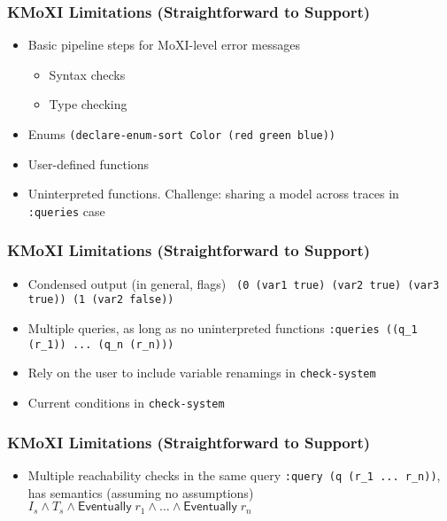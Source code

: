 \documentclass[11pt,xcolor={dvipsnames},hyperref={pdftex,pdfpagemode=UseNone,hidelinks,pdfdisplaydoctitle=true},usepdftitle=false]{beamer}
\newcommand{\code}[1]{{\footnotesize\texttt{#1}}}
\begin{document}
\begin{frame}
    \frametitle{KMoXI Limitations (Straightforward to Support)}
    \pause
    \begin{itemize}
        \item Basic pipeline steps for MoXI-level error messages
        \begin{itemize}
            \item Syntax checks 
            \item Type checking
        \end{itemize} 
        \pause
        \item Enums \newline 
        {\footnotesize \texttt{(declare-enum-sort Color (red green blue))}}
        \pause
        \item User-defined functions \pause
        \item Uninterpreted functions. Challenge: sharing a model across traces in \code{:queries} case
    \end{itemize}
\end{frame}

\begin{frame}
    \frametitle{KMoXI Limitations (Straightforward to Support)}
    \begin{itemize}
        \item Condensed output (in general, flags) \newline 
        {\footnotesize \texttt {
                (0 (var1 true) (var2 true) (var3 true)) \newline
                (1 (var2 false))}} \pause 
        \item Multiple queries, as long as no uninterpreted functions \newline 
        {\footnotesize \texttt {:queries ((q\_1 (r\_1)) ... (q\_n (r\_n)))}} \pause
        \item Rely on the user to include variable renamings in \code{check-system} \pause
        \item Current conditions in \code{check-system}
    \end{itemize}
\end{frame}

\begin{frame}
    \frametitle{KMoXI Limitations (Straightforward to Support)}
    \begin{itemize}
        \item Multiple reachability checks in the same query \newline \pause
        \code{:query (q (r\_1 ... r\_n))}\pause, \newline has semantics (assuming no assumptions) \newline 
        $I_s \land T_s \land \mathsf{Eventually}\; r_1 \land \dots \land \mathsf{Eventually}\; r_n$ 
    \end{itemize}
\end{frame}
 
\end{document}
